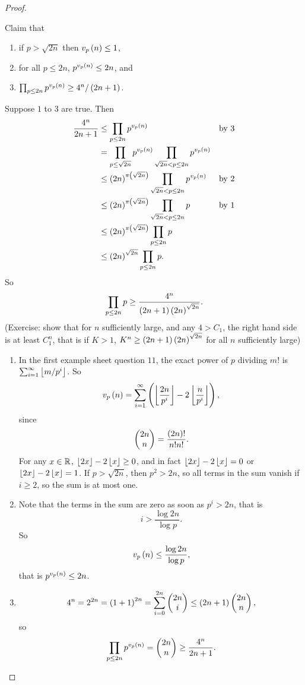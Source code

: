 \begin{proof}
\begin{itemize}
Claim that
\begin{enumerate}
\item if $ p > \sqrt{2n} $ then $ v_p\br{n} \le 1 $,
\item for all $ p \le 2n $, $ p^{v_p\br{n}} \le 2n $, and
\item $ \prod_{p \le 2n} p^{v_p\br{n}} \ge 4^n / \br{2n + 1} $.
\end{enumerate}
Suppose $ 1 $ to $ 3 $ are true. Then
\begin{align*}
\dfrac{4^n}{2n + 1}
& \le \prod_{p \le 2n} p^{v_p\br{n}} & \text{by} \ 3 \\
& = \prod_{p \le \sqrt{2n}} p^{v_p\br{n}} \prod_{\sqrt{2n} < p \le 2n} p^{v_p\br{n}} \\
& \le \br{2n}^{\pi\br{\sqrt{2n}}} \prod_{\sqrt{2n} < p \le 2n} p^{v_p\br{n}} & \text{by} \ 2 \\
& \le \br{2n}^{\pi\br{\sqrt{2n}}} \prod_{\sqrt{2n} < p \le 2n} p & \text{by} \ 1 \\
& \le \br{2n}^{\pi\br{\sqrt{2n}}} \prod_{p \le 2n} p \\
& \le \br{2n}^{\sqrt{2n}} \prod_{p \le 2n} p.
\end{align*}
So
$$ \prod_{p \le 2n} p \ge \dfrac{4^n}{\br{2n + 1}\br{2n}^{\sqrt{2n}}}. $$
(Exercise: show that for $ n $ sufficiently large, and any $ 4 > C_1 $, the right hand side is at least $ C_1^n $, that is if $ K > 1 $, $ K^n \ge \br{2n + 1}\br{2n}^{\sqrt{2n}} $ for all $ n $ sufficiently large)
\begin{enumerate}
\item In the first example sheet question $ 11 $, the exact power of $ p $ dividing $ m! $ is $ \sum_{i = 1}^\infty \left\lfloor m / p^i \right\rfloor $. So
$$ v_p\br{n} = \sum_{i = 1}^\infty \br{\fbr{\dfrac{2n}{p^i}} - 2\fbr{\dfrac{n}{p^i}}}, $$
since
$$ \twobyone{2n}{n} = \dfrac{\br{2n}!}{n!n!}. $$
For any $ x \in \mathbb{R} $, $ \left\lfloor 2x \right\rfloor - 2\left\lfloor x \right\rfloor \ge 0 $, and in fact $ \left\lfloor 2x \right\rfloor - 2\left\lfloor x \right\rfloor = 0 $ or $ \left\lfloor 2x \right\rfloor - 2\left\lfloor x \right\rfloor = 1 $. If $ p > \sqrt{2n} $, then $ p^2 > 2n $, so all terms in the sum vanish if $ i \ge 2 $, so the sum is at most one.
\item Note that the terms in the sum are zero as soon as $ p^i > 2n $, that is
$$ i > \dfrac{\log 2n}{\log p}. $$
So
$$ v_p\br{n} \le \dfrac{\log 2n}{\log p}, $$
that is $ p^{v_p\br{n}} \le 2n $.
\item
$$ 4^n = 2^{2n} = \br{1 + 1}^{2n} = \sum_{i = 0}^{2n} \twobyone{2n}{i} \le \br{2n + 1}\twobyone{2n}{n}, $$
so
$$ \prod_{p \le 2n} p^{v_p\br{n}} = \twobyone{2n}{n} \ge \dfrac{4^n}{2n + 1}. $$
\end{enumerate}


\end{itemize}
\end{proof}
